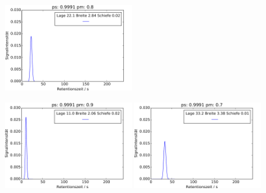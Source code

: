 \begin{figure}[h]
\begin{center}
\includegraphics[width=0.49\textwidth]{bilder/2s_einzeleinfluss/2s_t20}
\end{center}
\includegraphics[width=0.49\textwidth]{bilder/2s_einzeleinfluss/2s_t20_pmp}
\includegraphics[width=0.49\textwidth]{bilder/2s_einzeleinfluss/2s_t20_pmm}

\vspace*{5pt}


\end{figure}
